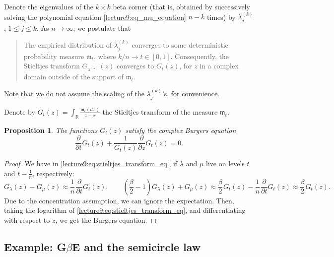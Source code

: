 \documentclass[letterpaper,11pt,oneside,reqno]{book}
\numberwithin{equation}{chapter}  %
\newcommand{\ssp}{\hspace{1pt}}
\newtheorem{proposition}{Proposition}[chapter]  %
\theoremstyle{definition}
\begin{document}
Denote the eigenvalues
of the $k\times k$ beta corner (that is,
obtained by successively solving the polynomial equation
\eqref{lecture9:eq_mu_equation}
$n-k$ times) by $\lambda^{(k)}_j$, $1\le j \le k$.
As $n\to\infty$, we postulate that
\begin{quote}
	The empirical distribution of $\lambda^{(k)}_j$
	converges to some deterministic probability measure
	$\mathfrak{m}_t$, where $k/n\to t\in[0,1]$.
	Consequently, the Stieltjes transform $G_{\lambda^{(k)}}(z)$
	converges to $G_t(z)$, for $z$ in a complex domain
	outside of the support of $\mathfrak{m}_t$.
\end{quote}
Note that we do not assume the scaling of the
$\lambda^{(k)}_j$'s, for convenience.

Denote by $\displaystyle
G_t(z)=\int_{\mathbb{R}}\frac{\mathfrak{m}_t(dx)}{z-x}$
the Stieltjes transform of the measure $\mathfrak{m}_t$.

\begin{proposition}
	The functions $G_t(z)$ satisfy the complex Burgers equation
	\begin{equation*}
		\frac{\partial}{\partial t}G_t(z) +
		\frac{1}{G_t(z)}\frac{\partial}{\partial z}G_t(z) = 0.
	\end{equation*}
\end{proposition}
\begin{proof}
	We have in \eqref{lecture9:eq:stieltjes_transform_eq},
	if $\lambda$ and $\mu$ live on levels $t$ and $t-\frac{1}{n}$,
	respectively:
	\begin{equation*}
		G_\lambda(z)-G_\mu(z)\approx
		\frac{1}{n}\ssp\frac{\partial}{\partial t}G_t(z),
		\qquad
		\left( \frac{\beta}{2}-1 \right)G_\lambda(z) + G_\mu(z) \approx
		\frac{\beta}{2}\ssp G_t(z) - \frac{1}{n}\ssp\frac{\partial}{\partial t}G_t(z)
		\approx
		\frac{\beta}{2}\ssp G_t(z) .
	\end{equation*}
	Due to the concentration assumption, we can ignore the expectation.
	Then, taking the logarithm of \eqref{lecture9:eq:stieltjes_transform_eq},
	and differentiating with respect to $z$,
	we get the Burgers equation.
\end{proof}

\subsection{Example: G$\beta$E and the semicircle law}
\end{document}
